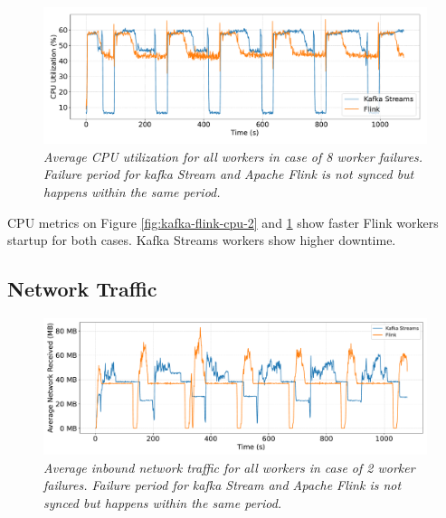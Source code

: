 \begin{figure}[H]
    \centering
    \includegraphics[width=1\textwidth]{figures/kafka-flink/cpu-utilization-8pods-kafka-flink}
    \caption{\textit{Average CPU utilization for all workers in case of 8 worker failures.
    Failure period for kafka Stream and Apache Flink is not synced but happens within the same period.}}
    \label{fig:kafka-flink-cpu-8}
\end{figure}

CPU metrics on Figure \ref{fig:kafka-flink-cpu-2} and \ref{fig:kafka-flink-cpu-8}
show faster Flink workers startup for both cases.
Kafka Streams workers show higher downtime.


\newpage
\subsection{Network Traffic}\label{subsec:inbound-network}

\begin{figure}[H]
    \centering
    \includegraphics[width=1\textwidth]{figures/kafka-flink/network-received-2pod-kafka-flink}
    \caption{\textit{Average inbound network traffic for all workers in case of 2 worker failures.
    Failure period for kafka Stream and Apache Flink is not synced but happens within the same period.}}
    \label{fig:kafka-flink-received-2}
\end{figure}


